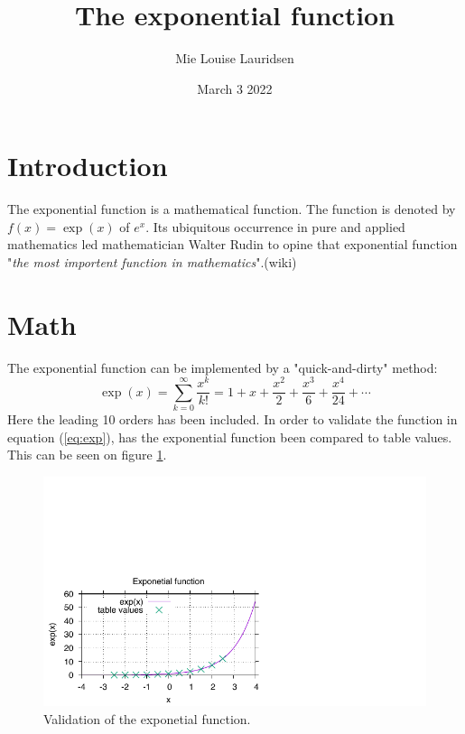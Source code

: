 \documentclass[11pt, twocolumn]{article}
\title{The exponential function}
\author{Mie Louise Lauridsen}
\date{March 3 2022}
\begin{document}
\maketitle

\section{Introduction}
The exponential function is a mathematical function. The function is denoted by $f(x)=\exp(x)$ of $e^x$. Its ubiquitous occurrence in pure and applied mathematics led mathematician Walter Rudin to opine that exponential function "\textit{the most importent function in mathematics}".(wiki) 

\section{Math}
The exponential function can be implemented by a "quick-and-dirty" method:
\begin{equation} \label{eq:exp}
\exp(x) = \sum_{k = 0}^{\infty} \frac{x^k}{k!} = 1 + x + \frac{x^2}{2} + \frac{x^3}{6} + \frac{x^4}{24} + \cdots
\end{equation}
Here the leading 10 orders has been included. In order to validate the function in equation (\ref{eq:exp}), has the exponential function been compared to table values. This can be seen on figure \ref{fig:exp}.

\begin{figure} [b]
\includegraphics{exp_gnuplot.pdf}
\caption{Validation of the exponetial function.}
\label{fig:exp}
\end{figure}
\end{document}
